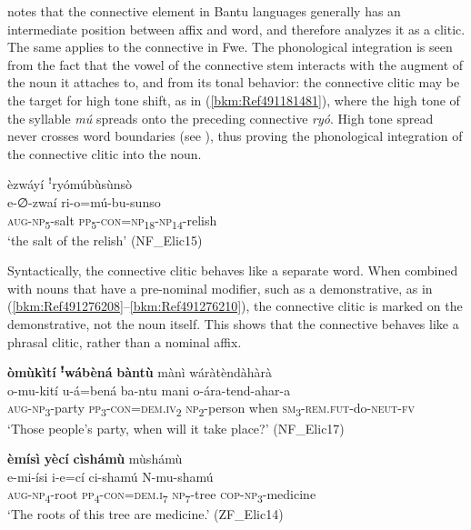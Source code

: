 {\citet{Velde2013}} notes that the connective element in Bantu languages generally has an intermediate position between affix and word, and therefore analyzes it as a clitic. The same applies to the connective in Fwe. The phonological integration is seen from the fact that the vowel of the connective stem interacts with the augment of the noun it attaches to, and from its tonal behavior: the connective clitic may be the target for high tone shift, as in (\ref{bkm:Ref491181481}), where the high tone of the syllable \textit{mú} spreads onto the preceding connective \textit{ryó}. High tone spread never crosses word boundaries (see ), thus proving the phonological integration of the connective clitic into the noun.

\ea
\label{bkm:Ref491181481}
èzwáyí ꜝryómúbùsùnsò\\
\gll e-∅-zwaí  ri-o=mú-bu-sunso\\
\textsc{aug}-\textsc{np}\textsubscript{5}-salt  \textsc{pp}\textsubscript{5}-\textsc{con}=\textsc{np}\textsubscript{18}-\textsc{np}\textsubscript{14}-relish\\
\glt ‘the salt of the relish’ (NF\_Elic15)
\z

Syntactically, the connective clitic behaves like a separate word. When combined with nouns that have a pre-nominal modifier, such as a demonstrative, as in (\ref{bkm:Ref491276208}--\ref{bkm:Ref491276210}), the connective clitic is marked on the demonstrative, not the noun itself. This shows that the connective behaves like a phrasal clitic, rather than a nominal affix.

\ea
\label{bkm:Ref491276208}
\textbf{òmùkìtí} \textbf{ꜝ}\textbf{wábèná} \textbf{bàntù} mànì wáràtèndàhàrà\\
\gll o-mu-kití    u-á=bená    ba-ntu mani  o-ára-tend-ahar-a \\
\textsc{aug}-\textsc{np}\textsubscript{3}-party  \textsc{pp}\textsubscript{3}-\textsc{con}=\textsc{dem}.\textsc{iv}\textsubscript{2}  \textsc{np}\textsubscript{2}-person when  \textsc{sm}\textsubscript{3}-\textsc{rem}.\textsc{fut}-do-\textsc{neut}-\textsc{fv}\\
\glt ‘Those people’s party, when will it take place?’ (NF\_Elic17)
\z

\ea
\label{bkm:Ref491276210}
\textbf{èmísì} \textbf{yècí} \textbf{cìshámù} mùshámù\\
\gll e-mi-ísi    i-e=cí      ci-shamú  N-mu-shamú\\
\textsc{aug}-\textsc{np}\textsubscript{4}-root  \textsc{pp}\textsubscript{4}-\textsc{con}=\textsc{dem}.\textsc{i}\textsubscript{7}  \textsc{np}\textsubscript{7}-tree  \textsc{cop}-\textsc{np}\textsubscript{3}-medicine\\
\glt ‘The roots of this tree are medicine.’ (ZF\_Elic14)
\z

